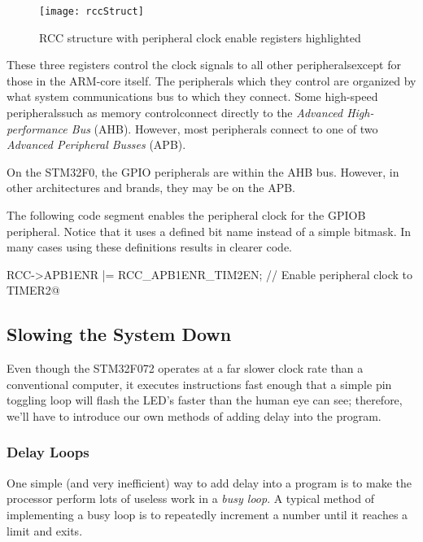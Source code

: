 \documentclass[openany,11pt,fleqn]{book} %
\makeatletter
\newcommand{\ilcode}[1]{
    \begin{center} \parskip=-15pt \colorbox{gray!20!white}{
        \parbox{\columnwidth-2\fboxsep}{
            \lstinline@#1@
        }
    } \end{center}
}
\makeatother
\begin{document}
\begin{figure}[]
    \centering\texttt{[image: rccStruct]}
    \caption{RCC structure with peripheral clock enable registers highlighted}
    \label{rccStruct}
\end{figure}

These three registers control the clock signals to all other peripherals\textemdash except for those in the ARM-core itself. The peripherals which they control are organized by what system communications bus to which they connect. Some high-speed peripherals\textemdash such as memory control\textemdash connect directly to the \textit{Advanced High-performance Bus} (AHB). However, most peripherals connect to one of two \textit{Advanced Peripheral Busses} (APB).

On the STM32F0, the GPIO peripherals are within the AHB bus. However, in other architectures and brands, they may be on the APB.

\begin{example}
    The following code segment enables the peripheral clock for the GPIOB peripheral. Notice that it uses a defined bit name instead of a simple bitmask. In many cases using these definitions results in clearer code.

    \ilcode{RCC->APB1ENR |= RCC\_APB1ENR\_TIM2EN;    // Enable peripheral clock to TIMER2}
    \smallskip
\end{example}

\subsection{Slowing the System Down}
Even though the STM32F072 operates at a far slower clock rate than a conventional computer, it executes instructions fast enough that a simple pin toggling loop will flash the LED's faster than the human eye can see; therefore, we'll have to introduce our own methods of adding delay into the program.

\subsubsection{Delay Loops}
One simple (and very inefficient) way to add delay into a program is to make the processor perform lots of useless work in a \textit{busy loop}. A typical method of implementing a busy loop is to repeatedly increment a number until it reaches a limit and exits.
\end{document}
